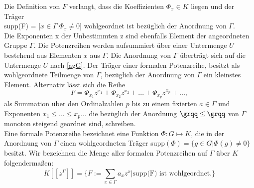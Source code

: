 Die Definition von $F$ verlangt, dass die Koeffizienten $\Phi_x \in K$ liegen und der Träger \\supp(F) = $\lbrack x \in \Gamma | \Phi_x \neq 0\rbrack $ wohlgeordnet ist bezüglich der Anordnung von $\Gamma$. \\
Die Exponenten x der Unbestimmten z sind ebenfalls Element der angeordneten Gruppe $\Gamma$. Die Potenzreihen werden aufsummiert über einer Untermenge $U$ bestehend aus Elementen $x$ aus $\Gamma$. Die Anordnung von $\Gamma$ überträgt sich auf die Untermenge $U$ nach \ref{agG}. Der Träger einer formalen Potenzreihe, besitzt als wohlgeordnete Teilmenge von $\Gamma$, bezüglich der Anordnung von $\Gamma$ ein kleinstes Element. Alternativ lässt sich die Reihe 
\[F = \Phi_{x_1}z^{x_1} + \Phi_{x_2}z^{x_2} + ... + \Phi_{x_p}z^{x_p} + ..., \] 
als Summation über den Ordinalzahlen $p$ bis zu einem fixierten $a \in \Gamma$ und Exponenten $x_1 \le ...\le x_p ...$ die bezüglich der Anordnung $\grqq \le \grqq$ von $\Gamma$ monoton steigend geordnet sind, schreiben. \cite{carruth48}\\
Eine formale Potenzreihe bezeichnet eine Funktion $\Phi: G \mapsto K$, die in der Anordnung von $\Gamma$ einen wohlgeordneten Träger supp$(\Phi) = \lbrace g \in G | \Phi(g) \neq 0 \rbrace$ besitzt. 
Wir bezeichnen die Menge aller formalen Potenzreihen auf $\Gamma$ über $K$ folgendermaßen: 
\[K[[z^{\Gamma}]] = \lbrace F :=  \sum_{x \in \Gamma}^{}a_x z^x | \text{supp(F)} \text{ ist wohlgeordnet.}\rbrace\]
%
%

